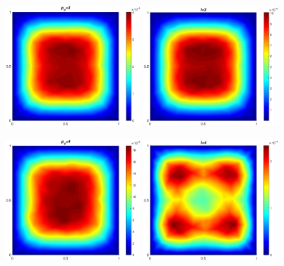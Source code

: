 \documentclass[letter,1p,11pt,oneside,onecolumn,sort&compress]{elsarticle}
\begin{document}
\begin{figure}[htbp]
\centering
 \includegraphics[width=0.45\textwidth,height=0.27\textheight]{plots/errorSurf_L4p3.eps}
 \includegraphics[width=0.45\textwidth,height=0.27\textheight]{plots/errorSurf_L4l3.eps}

 \includegraphics[width=0.45\textwidth,height=0.27\textheight]{plots/errorSurf_L4p4.eps}
 \includegraphics[width=0.45\textwidth,height=0.27\textheight]{plots/errorSurf_L4l4.eps}


\end{figure}
\end{document}
